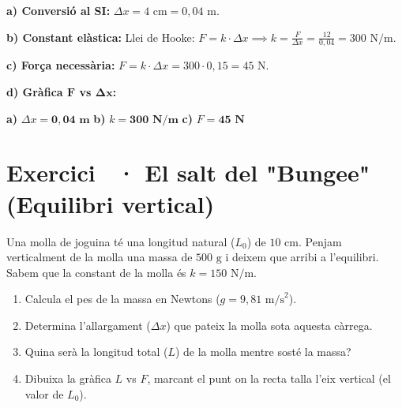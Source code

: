 \documentclass[12pt,a4paper,twoside]{article}
\newcounter{exercici}
\newcommand{\exercici}[1]{%
  \stepcounter{exercici}
  \section*{Exercici \theexercici\ \textnormal{· #1}}
  \vspace{-10pt}
}
\begin{document}
{\color{blue}
\textbf{a) Conversió al SI:} $\Delta x = 4\text{ cm} = 0{,}04\text{ m}$.

\textbf{b) Constant elàstica:} Llei de Hooke: $F = k \cdot \Delta x \implies k = \frac{F}{\Delta x} = \frac{12}{0{,}04} = 300\text{ N/m}$.

\textbf{c) Força necessària:} $F = k \cdot \Delta x = 300 \cdot 0{,}15 = 45\text{ N}$.

\textbf{d) Gràfica $\mathbf{F}$ vs $\mathbf{\Delta x}$:}
\begin{center}
\end{center}

\begin{tcolorbox}[title=Respostes Finals,colframe=red!70!black,colback=red!5,sharp corners=south,fontupper=\color{blue}]
\textbf{a)} $\Delta x = \mathbf{0{,}04\text{ m}}$ \quad \textbf{b)} $k = \mathbf{300\text{ N/m}}$ \quad \textbf{c)} $F = \mathbf{45\text{ N}}$
\end{tcolorbox}
}

\vspace{0.5cm}
\exercici{El salt del "Bungee" (Equilibri vertical)}
Una molla de joguina té una longitud natural ($L_0$) de $10\text{ cm}$. Penjam verticalment de la molla una massa de $500\text{ g}$ i deixem que arribi a l'equilibri. Sabem que la constant de la molla és $k = 150\text{ N/m}$.
\begin{enumerate}[label=\textbf{\alph*)}]
  \item Calcula el pes de la massa en Newtons ($g = 9{,}81\text{ m/s}^2$).
  \item Determina l'allargament ($\Delta x$) que pateix la molla sota aquesta càrrega.
  \item Quina serà la longitud total ($L$) de la molla mentre sosté la massa?
  \item Dibuixa la gràfica $L$ vs $F$, marcant el punt on la recta talla l'eix vertical (el valor de $L_0$).
\end{enumerate}
\end{document}
